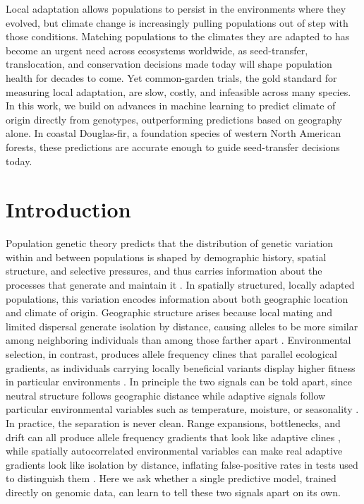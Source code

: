 \documentclass[]{article}
\begin{document}
Local adaptation allows populations to persist in the environments where they evolved,
but climate change is increasingly pulling populations out of step with those conditions.
Matching populations to the climates they are adapted to has become an urgent need
across ecosystems worldwide, as seed-transfer, translocation, and conservation decisions
made today will shape population health for decades to come. Yet common-garden trials,
the gold standard for measuring local adaptation, are slow, costly, and infeasible across
many species. In this work, we build on advances in machine learning to predict climate
of origin directly from genotypes, outperforming predictions based on geography alone.
In coastal Douglas-fir, a foundation species of western North American forests, these
predictions are accurate enough to guide seed-transfer decisions today.


\section{Introduction}

Population genetic theory predicts that the distribution
of genetic variation within and between populations
is shaped by demographic history, spatial structure,
and selective pressures,
and thus carries information about the processes
that generate and maintain it
\citep{lewontin_genetic_1974, hartl_principles_1980, ellegren_determinants_2016}.
In spatially structured, locally adapted populations,
this variation encodes information about both geographic location
and climate of origin.
Geographic structure arises because local mating and limited dispersal
generate isolation by distance,
causing alleles to be more similar among neighboring individuals
than among those farther apart
\citep{wright_isolation_1943, slatkin_isolation_1993}.
Environmental selection, in contrast,
produces allele frequency clines that parallel ecological gradients,
as individuals carrying locally beneficial variants
display higher fitness in particular environments
\citep{endler1977geographic, clausen_experimental_1948, kawecki_conceptual_2004}.
In principle the two signals can be told apart,
since neutral structure follows geographic distance
while adaptive signals follow particular environmental
variables such as temperature, moisture, or seasonality
\citep{rellstab_practical_2015, hoban_finding_2016, tigano_genomics_2016, coop_using_2010}.
In practice, the separation is never clean.
Range expansions, bottlenecks, and drift
can all produce allele frequency gradients that look like adaptive clines
\citep{excoffier_genetic_2009, novembre_spatial_2009}, while spatially 
autocorrelated environmental variables can make real 
adaptive gradients look like isolation by distance, 
inflating false-positive rates in tests
used to distinguish them \citep[e.g.,][]{guillot_dismantling_2013,legendre_should_2015}.
Here we ask whether a single predictive model, trained directly on genomic
data, can learn to tell these two signals apart on its own.
\end{document}
